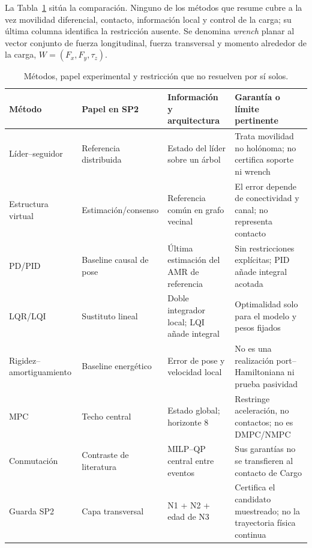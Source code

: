 \documentclass[12pt,a4paper]{article}
\begin{document}
La Tabla~\ref{tab:sp2-methods} sitúa la comparación. Ninguno de los métodos que
resume cubre a la vez movilidad diferencial, contacto, información local y
control de la carga; su última columna identifica la restricción ausente. Se
denomina \emph{wrench} planar al vector conjunto de fuerza
longitudinal, fuerza transversal y momento alrededor de la carga,
$W=(F_x,F_y,\tau_z)$.
\begin{table}[H]
\centering
\fontsize{8.0}{8.55}\selectfont
\setlength{\tabcolsep}{3.2pt}
\renewcommand{\arraystretch}{0.88}
\caption{Métodos, papel experimental y restricción que no resuelven por sí solos.}
\label{tab:sp2-methods}
\begin{tabularx}{\textwidth}{p{2.05cm} p{2.65cm} p{3.25cm} X}
\toprule
Método & Papel en SP2 & Información y arquitectura & Garantía o límite pertinente \\
\midrule
Líder--seguidor \parencite{desai2001formation} & Referencia distribuida & Estado del líder sobre un árbol & Trata movilidad no holónoma; no certifica soporte ni wrench \\
Estructura virtual \parencite{ren2004virtual} & Estimación/consenso & Referencia común en grafo vecinal & El error depende de conectividad y canal; no representa contacto \\
PD/PID & Baseline causal de pose & Última estimación del AMR de referencia & Sin restricciones explícitas; PID añade integral acotada \\
LQR/LQI \parencite{kalman1960optimal} & Sustituto lineal & Doble integrador local; LQI añade integral & Optimalidad solo para el modelo y pesos fijados \\
Rigidez--amortiguamiento \parencite{ortega2002passivity} & Baseline energético & Error de pose y velocidad local & No es una realización port--Hamiltoniana ni prueba pasividad \\
MPC \parencite{mayne2000mpc} & Techo central & Estado global; horizonte 8 & Restringe aceleración, no contactos; no es DMPC/NMPC \\
Conmutación \parencite{lee2025switching} & Contraste de literatura & MILP--QP central entre eventos & Sus garantías no se transfieren al contacto de Cargo \\
Guarda SP2 & Capa transversal & N1 + N2 + edad de N3 & Certifica el candidato muestreado; no la trayectoria física continua \\
\bottomrule
\end{tabularx}
\end{table}
\end{document}
